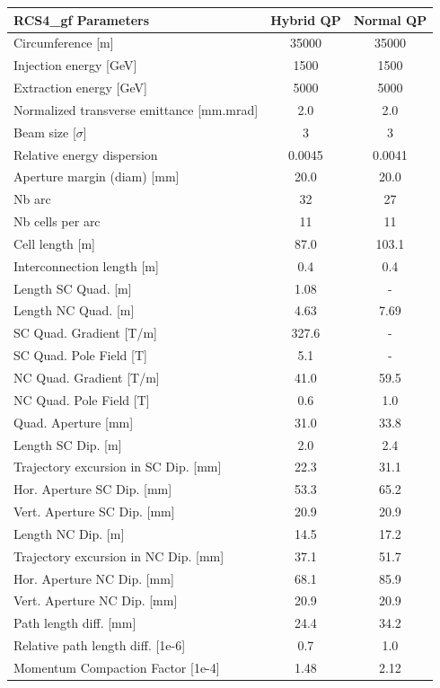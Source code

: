 \begin{tabular}{lcc}
\toprule
RCS4_gf Parameters & Hybrid QP & Normal QP \\
\midrule
Circumference [m] & 35000 & 35000 \\
Injection energy [GeV] & 1500 & 1500 \\
Extraction energy [GeV] & 5000 & 5000 \\
Normalized transverse emittance [mm.mrad] & 2.0 & 2.0 \\
Beam size [$\sigma$] & 3 & 3 \\
Relative energy dispersion & 0.0045 & 0.0041 \\
Aperture margin (diam) [mm] & 20.0 & 20.0 \\
Nb arc & 32 & 27 \\
Nb cells per arc & 11 & 11 \\
Cell length [m] & 87.0 & 103.1 \\
Interconnection length [m] & 0.4 & 0.4 \\
Length SC Quad. [m] & 1.08 & - \\
Length NC Quad. [m] & 4.63 & 7.69 \\
SC Quad. Gradient [T/m] & 327.6 & - \\
SC Quad. Pole Field [T] & 5.1 & - \\
NC Quad. Gradient [T/m] & 41.0 & 59.5 \\
NC Quad. Pole Field [T] & 0.6 & 1.0 \\
Quad. Aperture [mm] & 31.0 & 33.8 \\
Length SC Dip. [m] & 2.0 & 2.4 \\
Trajectory excursion in SC Dip. [mm] & 22.3 & 31.1 \\
Hor. Aperture SC Dip. [mm] & 53.3 & 65.2 \\
Vert. Aperture SC Dip. [mm] & 20.9 & 20.9 \\
Length NC Dip. [m] & 14.5 & 17.2 \\
Trajectory excursion in NC Dip. [mm] & 37.1 & 51.7 \\
Hor. Aperture NC Dip. [mm] & 68.1 & 85.9 \\
Vert. Aperture NC Dip. [mm] & 20.9 & 20.9 \\
Path length diff. [mm] & 24.4 & 34.2 \\
Relative path length diff. [1e-6] & 0.7 & 1.0 \\
Momentum Compaction Factor [1e-4] & 1.48 & 2.12 \\
\bottomrule
\end{tabular}
